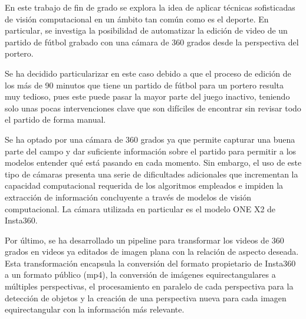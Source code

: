 En este trabajo de fin de grado se explora la idea de aplicar técnicas sofisticadas de visión computacional en un ámbito tan común como es el deporte. En particular, se investiga la posibilidad de automatizar la edición de video de un partido de fútbol grabado con una cámara de 360 grados desde la perspectiva del portero.

Se ha decidido particularizar en este caso debido a que el proceso de edición de los más de 90 minutos que tiene un partido de fútbol para un portero resulta muy tedioso, pues este puede pasar la mayor parte del juego inactivo, teniendo solo unas pocas intervenciones clave que son difíciles de encontrar sin revisar todo el partido de forma manual.

Se ha optado por una cámara de 360 grados ya que permite capturar una buena parte del campo y dar suficiente información sobre el partido para permitir a los modelos entender qué está pasando en cada momento. Sin embargo, el uso de este tipo de cámaras presenta una serie de dificultades adicionales que incrementan la capacidad computacional requerida de los algoritmos empleados e impiden la extracción de información concluyente a través de modelos de visión computacional. La cámara utilizada en particular es el modelo ONE X2 de Insta360.

Por último, se ha desarrollado un pipeline para transformar los videos de 360 grados en videos ya editados de imagen plana con la relación de aspecto deseada. Esta transformación encapsula la conversión del formato propietario de Insta360 a un formato público (mp4), la conversión de imágenes equirectangulares a múltiples perspectivas, el procesamiento en paralelo de cada perspectiva para la detección de objetos y la creación de una perspectiva nueva para cada imagen equirectangular con la información más relevante.
